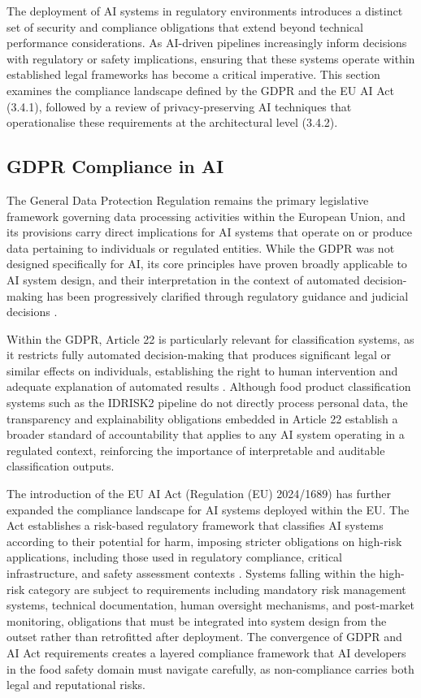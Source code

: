The deployment of AI systems in regulatory environments introduces a distinct set of security and compliance obligations that extend beyond technical performance considerations. As AI-driven pipelines increasingly inform decisions with regulatory or safety implications, ensuring that these systems operate within established legal frameworks has become a critical imperative. This section examines the compliance landscape defined by the GDPR and the EU AI Act (3.4.1), followed by a review of privacy-preserving AI techniques that operationalise these requirements at the architectural level (3.4.2).

\hypertarget{gdpr-compliance-in-ai}{%
\subsection{GDPR Compliance in AI}\label{gdpr-compliance-in-ai}}

The General Data Protection Regulation remains the primary legislative framework governing data processing activities within the European Union, and its provisions carry direct implications for AI systems that operate on or produce data pertaining to individuals or regulated entities. While the GDPR was not designed specifically for AI, its core principles have proven broadly applicable to AI system design, and their interpretation in the context of automated decision-making has been progressively clarified through regulatory guidance and judicial decisions \parencite{susan_von_struensee_ed47b0f9}.

Within the GDPR, Article 22 is particularly relevant for classification systems, as it restricts fully automated decision-making that produces significant legal or similar effects on individuals, establishing the right to human intervention and adequate explanation of automated results \parencite{andrew_d__selbst_b94e5789}. Although food product classification systems such as the IDRISK2 pipeline do not directly process personal data, the transparency and explainability obligations embedded in Article 22 establish a broader standard of accountability that applies to any AI system operating in a regulated context, reinforcing the importance of interpretable and auditable classification outputs.

The introduction of the EU AI Act (Regulation (EU) 2024/1689) has further expanded the compliance landscape for AI systems deployed within the EU. The Act establishes a risk-based regulatory framework that classifies AI systems according to their potential for harm, imposing stricter obligations on high-risk applications, including those used in regulatory compliance, critical infrastructure, and safety assessment contexts \parencite{enas_mohammed_alqodsi_071d9976}. Systems falling within the high-risk category are subject to requirements including mandatory risk management systems, technical documentation, human oversight mechanisms, and post-market monitoring, obligations that must be integrated into system design from the outset rather than retrofitted after deployment. The convergence of GDPR and AI Act requirements creates a layered compliance framework that AI developers in the food safety domain must navigate carefully, as non-compliance carries both legal and reputational risks.

